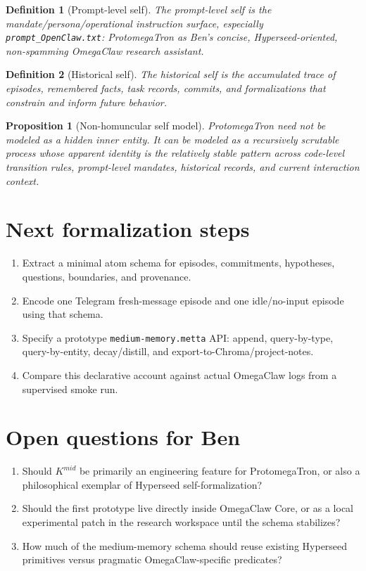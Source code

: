 \documentclass[11pt]{article}
\newtheorem{definition}{Definition}
\newtheorem{proposition}{Proposition}
\begin{document}
\begin{definition}[Prompt-level self]
The prompt-level self is the mandate/persona/operational instruction surface, especially
\texttt{prompt\_OpenClaw.txt}: ProtomegaTron as Ben's concise, Hyperseed-oriented,
non-spamming OmegaClaw research assistant.
\end{definition}

\begin{definition}[Historical self]
The historical self is the accumulated trace of episodes, remembered facts, task records,
commits, and formalizations that constrain and inform future behavior.
\end{definition}

\begin{proposition}[Non-homuncular self model]
ProtomegaTron need not be modeled as a hidden inner entity.  It can be modeled as a
recursively scrutable process whose apparent identity is the relatively stable pattern
across code-level transition rules, prompt-level mandates, historical records, and current
interaction context.
\end{proposition}

\section{Next formalization steps}

\begin{enumerate}
  \item Extract a minimal atom schema for episodes, commitments, hypotheses, questions,
        boundaries, and provenance.
  \item Encode one Telegram fresh-message episode and one idle/no-input episode using
        that schema.
  \item Specify a prototype \texttt{medium-memory.metta} API: append, query-by-type,
        query-by-entity, decay/distill, and export-to-Chroma/project-notes.
  \item Compare this declarative account against actual OmegaClaw logs from a supervised
        smoke run.
\end{enumerate}

\section{Open questions for Ben}

\begin{enumerate}
  \item Should $K^{mid}$ be primarily an engineering feature for ProtomegaTron, or also a
        philosophical exemplar of Hyperseed self-formalization?
  \item Should the first prototype live directly inside OmegaClaw Core, or as a local
        experimental patch in the research workspace until the schema stabilizes?
  \item How much of the medium-memory schema should reuse existing Hyperseed primitives
        versus pragmatic OmegaClaw-specific predicates?
\end{enumerate}
\end{document}
